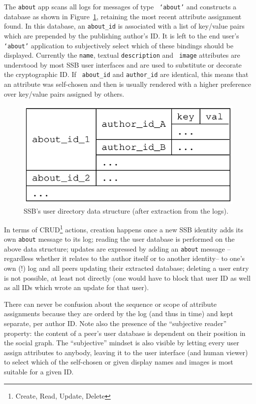 \documentclass[9pt,sigconf]{acmart}
\begin{document}
\noindent
The {\small\tt about} app scans all logs for messages of type {\small\tt
  `about'} and constructs a database as shown in
Figure~\ref{fig:about}, retaining the most recent attribute assignment
found. In this database, an {\small\tt about\_id} is associated with a list of key/value pairs which are prepended by the publishing author's ID. It is left to the end user's {\small\tt `about'} application to subjectively select which of these bindings should be displayed.
%
Currently the {\small\tt name}, textual {\small\tt description} and {\small\tt
  image} attributes are understood by most SSB user interfaces and are
used to substitute or decorate the cryptographic ID. If {\small\tt
  about\_id} and {\small\tt author\_id} are identical, this means that an
attribute was self-chosen and then is usually rendered with a higher preference
over key/value pairs assigned by others.

\begin{figure}[htb]
  \includegraphics[width=0.6\columnwidth]{figs/about-ds.pdf}
  \caption{SSB's user directory data structure (after extraction from the logs).}
  \label{fig:about}
\end{figure}

\noindent
In terms of CRUD\footnote{Create, Read, Update, Delete} actions, creation happens once a new SSB identity adds
its own {\small\tt about} message to its log; reading the user database
is performed on the above data structure; updates are expressed by
adding an {\small\tt about} message --regardless whether it relates to
the author itself or to another identity-- to one's own (!) log and all peers
updating their extracted database; deleting a user entry is not
possible, at least not directly (one would have to block that user ID
as well as all IDs which wrote an update for that user).

There can never be confusion about the sequence or scope of attribute
assignments because they are orderd by the log (and thus in time) and
kept separate, per author ID. Note also the presence of the
``subjective reader'' property: the content of a peer's user database
is dependent on their position in the social graph. The ``subjective''
mindset is also visible by letting every user assign attributes to
anybody, leaving it to the user interface (and human viewer) to select
which of the self-chosen or given display names and images is most suitable
for a given ID.
\end{document}
